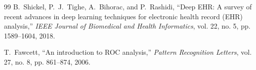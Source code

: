 \documentclass[conference]{IEEEtran}
\begin{document}
\begin{thebibliography}{99}
B.~Shickel, P.~J.~Tighe, A.~Bihorac, and P.~Rashidi, ``Deep EHR: A survey of recent advances in deep learning techniques for electronic health record (EHR) analysis,'' \textit{IEEE Journal of Biomedical and Health Informatics}, vol. 22, no. 5, pp. 1589--1604, 2018.

T.~Fawcett, ``An introduction to ROC analysis,'' \textit{Pattern Recognition Letters}, vol. 27, no. 8, pp. 861--874, 2006.

\end{thebibliography}
\end{document}
